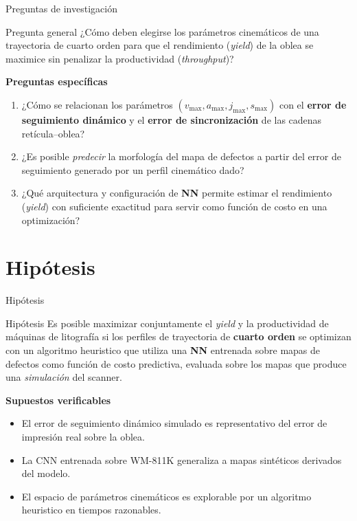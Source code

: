 \documentclass[en,16:9,navbarinline,bigfoot]{sdqbeamer}
\begin{document}
\begin{frame}{Preguntas de investigación}
    \begin{purpleblock}{Pregunta general}
        ¿Cómo deben elegirse los parámetros cinemáticos de una trayectoria de cuarto orden para que el rendimiento (\textit{yield}) de la oblea se maximice sin penalizar la productividad (\textit{throughput})?
    \end{purpleblock}
    \vspace{0.15cm}
    \textbf{Preguntas específicas}
    \begin{enumerate}
        \item ¿Cómo se relacionan los parámetros $(v_{\max}, a_{\max}, j_{\max}, s_{\max})$ con el \textbf{error de seguimiento dinámico} y el \textbf{error de sincronización} de las cadenas retícula--oblea?
        \item ¿Es posible \emph{predecir} la morfología del mapa de defectos a partir del error de seguimiento generado por un perfil cinemático dado?
        \item ¿Qué arquitectura y configuración de \textbf{NN} permite estimar el rendimiento (\textit{yield}) con suficiente exactitud para servir como función de costo en una optimización?
    \end{enumerate}
\end{frame}

\section{Hipótesis}

\begin{frame}{Hipótesis}
    \begin{blueblock}{Hipótesis}
        Es posible maximizar conjuntamente el \textit{yield} y la productividad de máquinas de litografía si los perfiles de trayectoria de \textbf{cuarto orden} se optimizan con un algoritmo heuristico que utiliza una \textbf{NN} entrenada sobre mapas de defectos como función de costo predictiva, evaluada sobre los mapas que produce una \textit{simulación} del scanner.
    \end{blueblock}
    \vspace{0.2cm}
    \textbf{Supuestos verificables}
    \begin{itemize}
        \item El error de seguimiento dinámico simulado es representativo del error de impresión real sobre la oblea.
        \item La CNN entrenada sobre WM-811K generaliza a mapas sintéticos derivados del modelo.
        \item El espacio de parámetros cinemáticos es explorable por un algoritmo heuristico en tiempos razonables.
    \end{itemize}
\end{frame}
\end{document}
